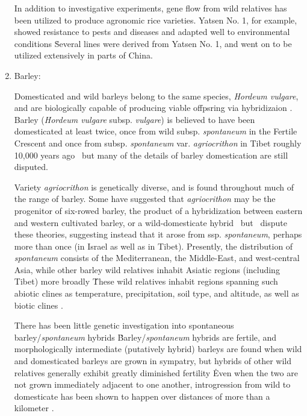\documentclass[11pt]{article}
\begin{document}
\begin{enumerate}
In addition to investigative experiments, gene flow from wild relatives has been utilized to produce agronomic rice varieties.
Yatsen No. 1, for example, showed resistance to pests and diseases and adapted well to environmental conditions \cite{ting1933wild}\.
Several lines were derived from Yatsen No. 1, and went on to be utilized extensively in parts of China.





		
	

\item{Barley:}
		
Domesticated and wild barleys belong to the same species, \emph{Hordeum vulgare}, and are biologically capable of producing viable offpsring via hybridizaion \cite{von1995ecographical}.
Barley (\emph{Hordeum vulgare} subsp. \emph{vulgare}) is believed to have been domesticated at least twice, once from wild subsp. \emph{spontaneum} in the Fertile Crescent and once from subsp. \emph{spontaneum} var. \emph{agriocrithon} in Tibet roughly 10,000 years ago \cite{takahashi1955origin, badr2000origin, oka2012origin, azhaguvel2007phylogenetic, haberer2015barley}\, but many of the details of barley domestication are still disputed.


Variety \emph{agriocrithon} is genetically diverse, and is found throughout much of the range of barley.
Some have suggested that \emph{agriocrithon} may be the progenitor of six-rowed barley, the product of a hybridization between eastern and western cultivated barley, or a wild-domesticate hybrid \cite{staudt1961origin, zohary1959hordeum, murphy1982origin}\, but \cite{azhaguvel2007phylogenetic}\ dispute these theories, suggesting instead that it arose from ssp. \emph{spontaneum}, perhaps more than once (in Israel as well as in Tibet).
Presently, the distribution of \emph{spontaneum} consists of the Mediterranean, the Middle-East, and west-central Asia, while other barley wild relatives inhabit Asiatic regions (including Tibet) more broadly \cite{nevo2010drought, harlan1995living, CWR}\.
These wild relatives inhabit regions spanning such abiotic clines as temperature, precipitation, soil type, and altitude, as well as biotic clines \cite{nevo2010drought}.


There has been little genetic investigation into spontaneous barley/\emph{spontaneum} hybrids \cite{ellstrand2003dangerous}\.
Barley/\emph{spontaneum} hybrids are fertile, and morphologically intermediate (putatively hybrid) barleys are found when wild and domesticated barleys are grown in sympatry, but hybrids of other wild relatives generally exhibit greatly diminished fertility \cite{ellstrand2003dangerous, harlan1995living}\.
Even when the two are not grown immediately adjacent to one another, introgression from wild to domesticate has been shown to happen over distances of more than a kilometer \cite{hillman2001new}.



\end{enumerate}
\end{document}

